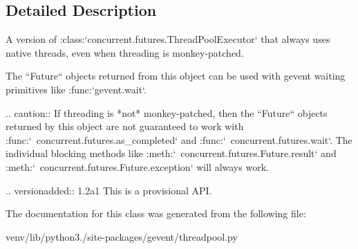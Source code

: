 \subsection{Detailed Description}
\begin{DoxyVerb}A version of :class:`concurrent.futures.ThreadPoolExecutor` that
always uses native threads, even when threading is monkey-patched.

The ``Future`` objects returned from this object can be used
with gevent waiting primitives like :func:`gevent.wait`.

.. caution:: If threading is *not* monkey-patched, then the ``Future``
   objects returned by this object are not guaranteed to work with
   :func:`~concurrent.futures.as_completed` and :func:`~concurrent.futures.wait`.
   The individual blocking methods like :meth:`~concurrent.futures.Future.result`
   and :meth:`~concurrent.futures.Future.exception` will always work.

.. versionadded:: 1.2a1
   This is a provisional API.
\end{DoxyVerb}
 

The documentation for this class was generated from the following file\+:\begin{DoxyCompactItemize}
\item 
venv/lib/python3./site-\/packages/gevent/threadpool.\+py\end{DoxyCompactItemize}
